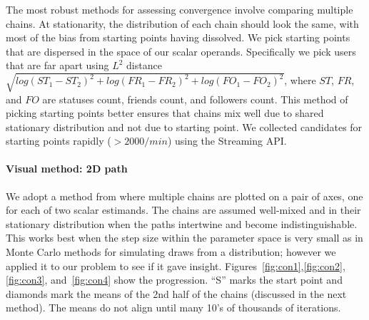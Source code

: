 The most robust methods for assessing convergence involve comparing
multiple chains. At stationarity, the distribution of each chain
should look the same, with most of the bias from starting points
having dissolved. We pick starting points that are dispersed in the
space of our scalar operands. Specifically we pick users that are far
apart using $L^2$ distance $\sqrt{log(ST_1-ST_2)^2 + log(FR_1-FR_2)^2 +
    log(FO_1-FO_2)^2}$, where $ST$, $FR$, and $FO$ are statuses count,
friends count, and followers count. This method of picking starting
points better ensures that chains mix well
due to shared stationary distribution and not due to starting point.
We collected candidates for starting points rapidly ($>2000/min$) using the
Streaming API.

\paragraph{Visual method: 2D path}

We adopt a method from \cite{Gelman:2003} where multiple chains are
plotted on a pair of axes, one for each of two scalar estimands. The
chains are assumed well-mixed and in their stationary distribution
when the paths intertwine and become indistinguishable. This works
best when the step size within the parameter space is very small as in
Monte Carlo methods for simulating draws from a distribution;
however we applied it to our problem to see if it gave insight.
Figures~\ref{fig:con1},\ref{fig:con2},\ref{fig:con3},
and~\ref{fig:con4} show the progression. ``S'' marks the start point
and diamonds mark the means of the 2nd half of the chains (discussed
in the next method). The means
do not align until many 10's of thousands of iterations.


